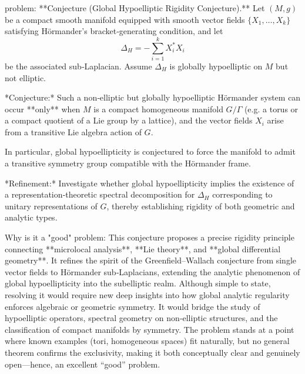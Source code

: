 problem:  
**Conjecture (Global Hypoelliptic Rigidity Conjecture).**  
Let \( (M,g) \) be a compact smooth manifold equipped with smooth vector fields \( \{X_1,\dots,X_k\} \) satisfying Hörmander’s bracket‑generating condition, and let  
\[
\Delta_H = -\sum_{i=1}^k X_i^*X_i
\]
be the associated sub‑Laplacian.  
Assume \( \Delta_H \) is globally hypoelliptic on \(M\) but not elliptic.

*Conjecture:* Such a non‑elliptic but globally hypoelliptic Hörmander system can occur **only** when \(M\) is a compact homogeneous manifold \(G/\Gamma\) (e.g. a torus or a compact quotient of a Lie group by a lattice), and the vector fields \(X_i\) arise from a transitive Lie algebra action of \(G\).  

In particular, global hypoellipticity is conjectured to force the manifold to admit a transitive symmetry group compatible with the Hörmander frame.  

*Refinement:* Investigate whether global hypoellipticity implies the existence of a representation‑theoretic spectral decomposition for \(\Delta_H\) corresponding to unitary representations of \(G\), thereby establishing rigidity of both geometric and analytic types.

Why is it a "good" problem:  
This conjecture proposes a precise rigidity principle connecting **microlocal analysis**, **Lie theory**, and **global differential geometry**. It refines the spirit of the Greenfield–Wallach conjecture from single vector fields to Hörmander sub‑Laplacians, extending the analytic phenomenon of global hypoellipticity into the subelliptic realm. Although simple to state, resolving it would require new deep insights into how global analytic regularity enforces algebraic or geometric symmetry. It would bridge the study of hypoelliptic operators, spectral geometry on non‑elliptic structures, and the classification of compact manifolds by symmetry. The problem stands at a point where known examples (tori, homogeneous spaces) fit naturally, but no general theorem confirms the exclusivity, making it both conceptually clear and genuinely open—hence, an excellent “good” problem.